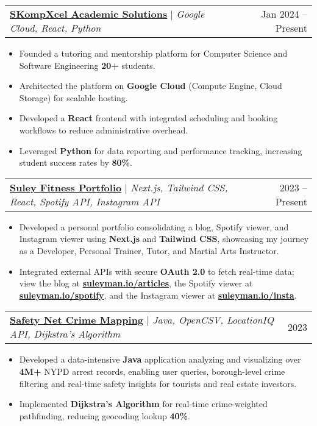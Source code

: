 \documentclass[letterpaper,11pt]{article}
\makeatletter
\newcommand{\resumeItem}[1]{
  \item\small{
    {#1 \vspace{-2pt}}
  }
}
\newcommand{\resumeProjectHeading}[2]{
    \item
    \begin{tabular*}{0.97\textwidth}{l@{\extracolsep{\fill}}r}
      \small#1 & #2 \\
    \end{tabular*}\vspace{-7pt}
}
\newcommand{\resumeItemListStart}{\begin{itemize}}
\newcommand{\resumeItemListEnd}{\end{itemize}\vspace{-5pt}}
\makeatother
\begin{document}
      \resumeProjectHeading
          {\href{https://www.skompxcel.com/}{\textbf{SKompXcel Academic Solutions}} $|$ \emph{Google Cloud, React, Python}}{Jan 2024 -- Present}
          \resumeItemListStart
            \resumeItem{Founded a tutoring and mentorship platform for Computer Science and Software Engineering \textbf{20+} students.}
            \resumeItem{Architected the platform on \textbf{Google Cloud} (Compute Engine, Cloud Storage) for scalable hosting.}
            \resumeItem{Developed a \textbf{React} frontend with integrated scheduling and booking workflows to reduce administrative overhead.}
            \resumeItem{Leveraged \textbf{Python} for data reporting and performance tracking, increasing student success rates by \textbf{80\%}.}
          \resumeItemListEnd
          
      \resumeProjectHeading
            {\href{https://www.suleyman.io}{\textbf{Suley Fitness Portfolio}} $|$ \emph{Next.js, Tailwind CSS, React, Spotify API, Instagram API}}{2023 -- Present}
          \resumeItemListStart
            \resumeItem{Developed a personal portfolio consolidating a blog, Spotify viewer, and Instagram viewer using \textbf{Next.js} and \textbf{Tailwind CSS}, showcasing my journey as a Developer, Personal Trainer, Tutor, and Martial Arts Instructor.}
            \resumeItem{Integrated external APIs with secure \textbf{OAuth 2.0} to fetch real-time data; view the blog at \href{https://www.suleyman.io/articles}{\textbf{suleyman.io/articles}}, the Spotify viewer at \href{https://www.suleyman.io/spotify}{\textbf{\textbf{suleyman.io/spotify}}}, and the Instagram viewer at \href{https://www.suleyman.io/insta}{\textbf{suleyman.io/insta}}.}
          \resumeItemListEnd

      \resumeProjectHeading
          {\href{https://github.com/kianis4/Saftey-Net}{\textbf{Safety Net Crime Mapping}} $|$ \emph{Java, OpenCSV, LocationIQ API, Dijkstra’s Algorithm}}{2023}
          \resumeItemListStart
            \resumeItem{Developed a data-intensive \textbf{Java} application analyzing and visualizing over \textbf{4M+} NYPD arrest records, enabling user queries, borough-level crime filtering and real-time safety insights for tourists and real estate investors.}
            \resumeItem{Implemented \textbf{Dijkstra’s Algorithm} for real-time crime-weighted pathfinding, reducing geocoding lookup \textbf{40\%}.}
          \resumeItemListEnd
\end{document}
